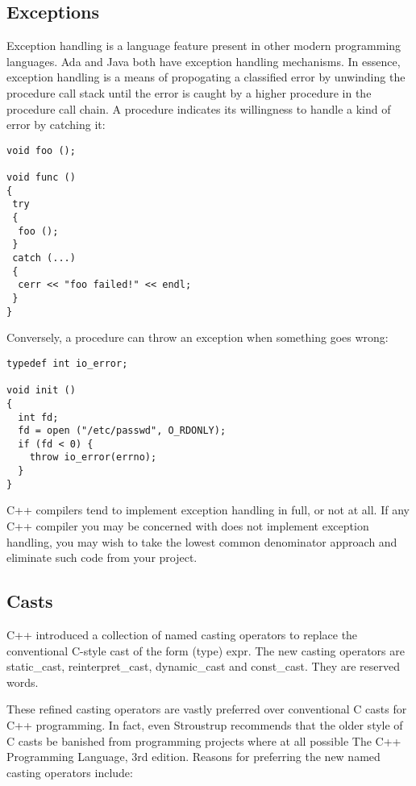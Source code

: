 \subsection{Exceptions}

Exception handling is a language feature present in other modern programming languages. Ada and Java both have exception handling mechanisms. In essence, exception handling is a means of propogating a classified error by unwinding the procedure call stack until the error is caught by a higher procedure in the procedure call chain. A procedure indicates its willingness to handle a kind of error by catching it:

\begin{Verbatim}[frame=single]
void foo ();

void func ()
{
 try 
 {
  foo ();
 }
 catch (...) 
 {
  cerr << "foo failed!" << endl;
 }
}
\end{Verbatim}

Conversely, a procedure can throw an exception when something goes wrong:

\begin{Verbatim}[frame=single]
typedef int io_error;

void init ()
{
  int fd; 
  fd = open ("/etc/passwd", O_RDONLY);
  if (fd < 0) {
    throw io_error(errno);
  }
}
\end{Verbatim}

C++ compilers tend to implement exception handling in full, or not at all. If any C++ compiler you may be concerned with does not implement exception handling, you may wish to take the lowest common denominator approach and eliminate such code from your project. 

\subsection{Casts}

C++ introduced a collection of named casting operators to replace the 
conventional C-style cast of the form (type) expr. The new casting operators 
are static\_{}cast, reinterpret\_{}cast, dynamic\_{}cast and 
const\_{}cast. They are reserved words.

These refined casting operators are vastly preferred over conventional C casts for C++ programming. In fact, even Stroustrup recommends that the older style of C casts be banished from programming projects where at all possible The C++ Programming Language, 3rd edition. Reasons for preferring the new named casting operators include: 

